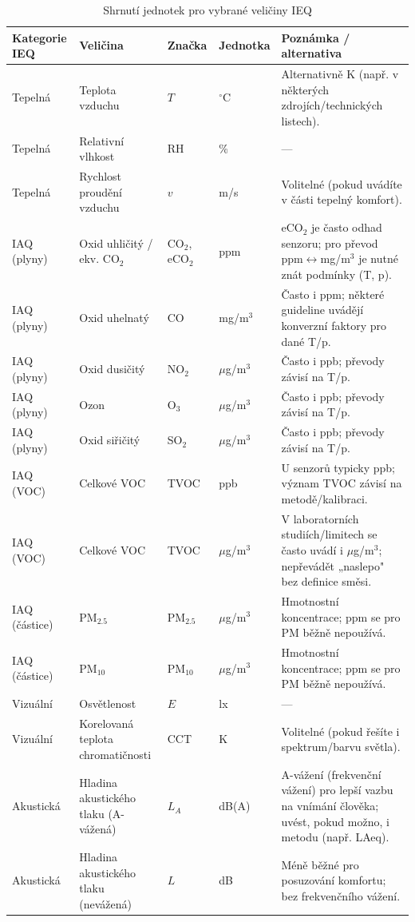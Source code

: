 \begin{table}[!tbp]

\begin{center}
\footnotesize
\renewcommand{\arraystretch}{1.15}
\caption{Shrnutí jednotek pro vybrané veličiny IEQ}\label{tab:ieq-jednotky}
\begin{tabularx}{\textwidth}{p{2.2cm} p{3.0cm} p{1.8cm} p{1.8cm} >{\raggedright\arraybackslash}X}
\toprule
\textbf{Kategorie IEQ} & \textbf{Veličina} & \textbf{Značka} & \textbf{Jednotka} & \textbf{Poznámka /
  alternativa} \\
\midrule
Tepelná & Teplota vzduchu & $T$ & $^\circ$C & Alternativně K (např. v některých zdrojích/technických
listech). \\
Tepelná & Relativní vlhkost & RH & \% & --- \\
Tepelná & Rychlost proudění vzduchu & $v$ & m/s & Volitelné (pokud uvádíte v části tepelný komfort).
\\
\midrule
IAQ (plyny) & Oxid uhličitý / ekv. CO$_2$ & CO$_2$, eCO$_2$ & ppm & eCO$_2$ je často odhad senzoru;
pro převod ppm$\leftrightarrow$mg/m$^3$ je nutné znát podmínky (T, p). \\
IAQ (plyny) & Oxid uhelnatý & CO & mg/m$^3$ & Často i ppm; některé guideline uvádějí konverzní
faktory pro dané T/p. \\
IAQ (plyny) & Oxid dusičitý & NO$_2$ & $\mu$g/m$^3$ & Často i ppb; převody závisí na T/p. \\
IAQ (plyny) & Ozon & O$_3$ & $\mu$g/m$^3$ & Často i ppb; převody závisí na T/p. \\
IAQ (plyny) & Oxid siřičitý & SO$_2$ & $\mu$g/m$^3$ & Často i ppb; převody závisí na T/p. \\
IAQ (VOC) & Celkové VOC & TVOC & ppb & U senzorů typicky ppb; význam TVOC závisí na
metodě/kalibraci. \\
IAQ (VOC) & Celkové VOC & TVOC & $\mu$g/m$^3$ & V laboratorních studiích/limitech se často uvádí i
$\mu$g/m$^3$; nepřevádět „naslepo" bez definice směsi. \\
IAQ (částice) & PM$_{2.5}$ & PM$_{2.5}$ & $\mu$g/m$^3$ & Hmotnostní koncentrace; ppm se pro PM běžně
nepoužívá. \\
IAQ (částice) & PM$_{10}$ & PM$_{10}$ & $\mu$g/m$^3$ & Hmotnostní koncentrace; ppm se pro PM běžně
nepoužívá. \\
\midrule
Vizuální & Osvětlenost & $E$ & lx & --- \\
Vizuální & Korelovaná teplota chromatičnosti & CCT & K & Volitelné (pokud řešíte i spektrum/barvu
světla). \\
\midrule
Akustická & Hladina akustického tlaku (A-vážená) & $L_A$ & dB(A) & A-vážení (frekvenční vážení) pro
lepší vazbu na vnímání člověka; uvést, pokud možno, i metodu (např. LAeq). \\
Akustická & Hladina akustického tlaku (nevážená) & $L$ & dB & Méně běžné pro posuzování komfortu;
bez frekvenčního vážení. \\
\bottomrule
\end{tabularx}
\end{center}


\end{table}
